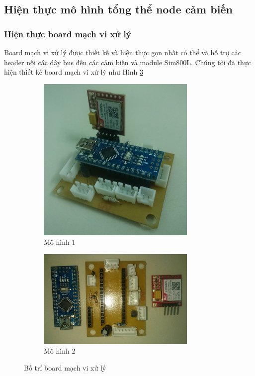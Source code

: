 \newpage
\subsection{Hiện thực mô hình tổng thể node cảm biến}
\subsubsection*{Hiện thực board mạch vi xử lý}
Board mạch vi xử lý được thiết kế và hiện thực gọn nhất có thể và hỗ trợ các header nối các dây bus đến các cảm biến và module Sim800L. Chúng tôi đã thực hiện thiết kế board mạch vi xử lý như Hình \ref{fig:botrimcu}

\begin{figure}[H]
	\centering  
	\begin{subfigure}[b]{0.5\textwidth}
		\includegraphics[width=3in]{mcu}
		\caption[Mô hình 1]{Mô hình 1}
		\label{fig:mcu}
	\end{subfigure}\hfill
	\begin{subfigure}[b]{0.5\textwidth}
		\includegraphics[width=3in]{mcu_2}
		\caption[Mô hình 2]{Mô hình 2}
		\label{fig:mcu_2}
	\end{subfigure}
	\caption{Bố trí board mạch vi xử lý}\label{fig:botrimcu}
\end{figure}

